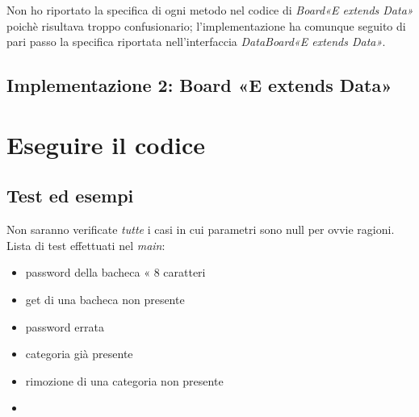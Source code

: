 \documentclass[10pt, a4paper]{article}
\begin{document}
Non ho riportato la specifica di ogni metodo nel codice di \textit{Board«E extends Data»} poichè risultava troppo confusionario; l'implementazione ha comunque seguito di pari passo la specifica riportata nell'interfaccia \textit{DataBoard«E extends Data»}.

\subsection{Implementazione 2: Board «E extends Data» }



\clearpage
\section{Eseguire il codice}
\subsection{Test ed esempi}
Non saranno verificate \textit{tutte} i casi in cui parametri sono null per ovvie ragioni.\\
Lista di test effettuati nel \textit{main}:
\begin{itemize}
\item password della bacheca « 8 caratteri
\item get di una bacheca non presente
\item password errata
\item categoria già presente
\item rimozione di una categoria non presente
\item 
\end{itemize}
 






\end{document}
